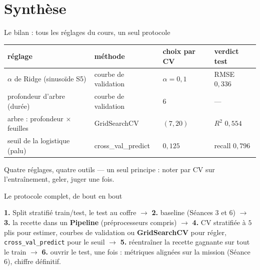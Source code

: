 \documentclass[aspectratio=169,11pt]{beamer}
\begin{document}
\section{Synthèse}

\begin{frame}{Le bilan : tous les réglages du cours, un seul protocole}
\begin{ucadex}
{\small \begin{center}\footnotesize\renewcommand{\arraystretch}{1.12}\begin{tabular}{l|l|l|l}
réglage & méthode & choix par CV & verdict test\\\hline
$\alpha$ de Ridge (sinusoïde S5) & courbe de validation & $\alpha = 0{,}1$ & RMSE $0{,}336$\\
profondeur d'arbre (durée) & courbe de validation & $6$ & —\\
arbre : profondeur $\times$ feuilles & GridSearchCV & $(7, 20)$ & $R^2$ $0{,}554$\\
seuil de la logistique (palu) & cross\_val\_predict & $0{,}125$ & recall $0{,}796$\\
\end{tabular}\end{center}
Quatre réglages, quatre outils — un seul principe : noter par CV sur l'entraînement, geler, juger une fois.}
\end{ucadex}
\end{frame}

\begin{frame}{Le protocole complet, de bout en bout}
\begin{ucadret}
{\small \textbf{1.} Split stratifié train/test, le test au coffre $\to$ \textbf{2.} baseline (Séances 3 et 6) $\to$ \textbf{3.} la recette dans un \textbf{Pipeline} (préprocesseurs compris) $\to$ \textbf{4.} CV stratifiée à $5$ plis pour estimer, courbes de validation ou \textbf{GridSearchCV} pour régler, \texttt{cross\_val\_predict} pour le seuil $\to$ \textbf{5.} réentraîner la recette gagnante sur tout le train $\to$ \textbf{6.} ouvrir le test, une fois : métriques alignées sur la mission (Séance 6), chiffre définitif.}
\end{ucadret}
\end{frame}
\end{document}
